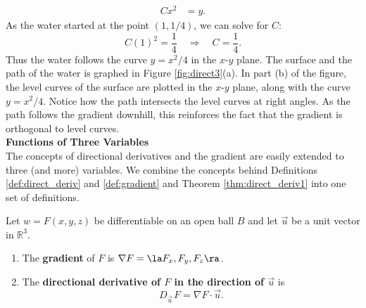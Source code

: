 {\begin{align*}
Cx^2 &= y.
\end{align*}
As the water started at the point $(1,1/4)$, we can solve for $C$:
$$C(1)^2 = \frac14 \quad \Rightarrow \quad C = \frac14.$$
Thus the water follows the curve $y=x^2/4$ in the $x$-$y$ plane. The surface and the path of the water is graphed in Figure \ref{fig:direct3}(a). In part (b) of the figure, the level curves of the surface are plotted in the $x$-$y$ plane, along with the curve $y=x^2/4$. Notice how the path intersects the level curves at right angles. As the path follows the gradient downhill, this reinforces the fact that the gradient is orthogonal to level curves.
}\\

\noindent\textbf{\large Functions of Three Variables}\\

The concepts of directional derivatives and the gradient are easily extended to three (and more) variables. We combine the concepts behind Definitions \ref{def:direct_deriv} and \ref{def:gradient} and Theorem \ref{thm:direct_deriv1} into one set of definitions.

{Let $w=F(x,y,z)$ be differentiable on an open ball $B$ and let $\vec u $ be a unit vector in $\mathbb{R}^3$.
\begin{enumerate}
	\item	The \textbf{gradient} of $F$ is $\nabla F = \la F_x,F_y,F_z\ra$.
	\item The \textbf{directional derivative of $F$ in the direction of $\vec u$} is $$D_{\vec u\,}F=\nabla F\cdot \vec u.$$
\end{enumerate}
}

